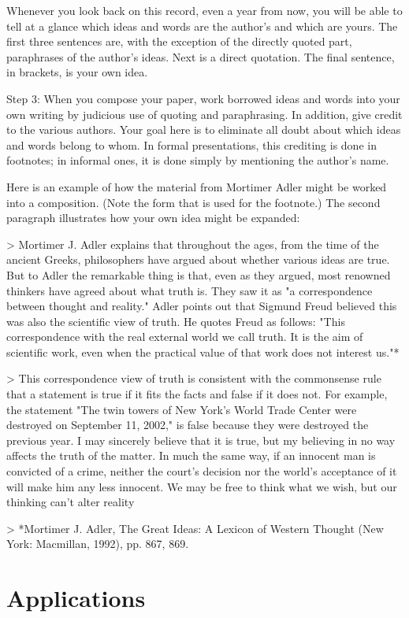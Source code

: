 \documentclass{book}
\begin{document}
Whenever you look back on this record, even a year from now, you will be able to tell at a glance which ideas and words are the author’s and which are yours. The first three sentences are, with the exception of the directly quoted part, paraphrases of the author’s ideas. Next is a direct quotation. The final sentence, in brackets, is your own idea.

Step 3: When you compose your paper, work borrowed ideas and words into your own writing by judicious use of quoting and paraphrasing.  In addition, give credit to the various authors. Your goal here is to eliminate all doubt about which ideas and words belong to whom. In formal presentations, this crediting is done in footnotes; in informal ones, it is done simply by mentioning the author’s name.

Here is an example of how the material from Mortimer Adler might be worked into a composition. (Note the form that is used for the footnote.) The second paragraph illustrates how your own idea might be expanded:

> Mortimer J. Adler explains that throughout the ages, from the time of the ancient Greeks, philosophers have argued about whether various ideas are true. But to Adler the remarkable thing is that, even as they argued, most renowned thinkers have agreed about what truth is. They saw it as "a correspondence between thought and reality." Adler points out that Sigmund Freud believed this was also the scientific view of truth. He quotes Freud as follows: "This correspondence with the real external world we call truth. It is the aim of scientific work, even when the practical value of that work does not interest us."*

> This correspondence view of truth is consistent with the commonsense rule that a statement is true if it fits the facts and false if it does not. For example, the statement "The twin towers of New York’s World Trade Center were destroyed on September 11, 2002," is false because they were destroyed the previous year. I may sincerely believe that it is true, but my believing in no way affects the truth of the matter. In much the same way, if an innocent man is convicted of a crime, neither the court’s decision nor the world’s acceptance of it will make him any less innocent. We may be free to think what we wish, but our thinking can’t alter reality

> *Mortimer J. Adler, The Great Ideas: A Lexicon of Western Thought (New York: Macmillan, 1992), pp. 867, 869.

\section{Applications}
\end{document}
